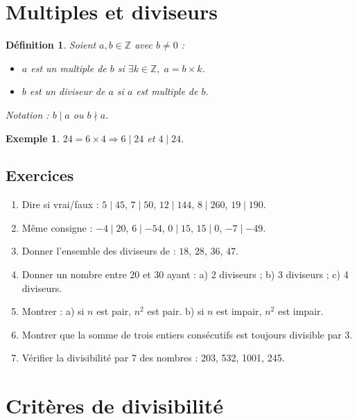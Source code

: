 \documentclass[12pt,a4paper]{article}
\newtheorem{definition}{Définition}[section]
\newtheorem{example}{Exemple}[section]
\begin{document}
\section{Multiples et diviseurs}

\begin{definition}
Soient $a,b \in \mathbb{Z}$ avec $b \neq 0$ :  
\begin{itemize}
    \item $a$ est un multiple de $b$ si $\exists k \in \mathbb{Z},\; a = b \times k$.  
    \item $b$ est un diviseur de $a$ si $a$ est multiple de $b$.  
\end{itemize}
Notation : $b \mid a$ ou $b \nmid a$.
\end{definition}

\begin{example}
$24 = 6 \times 4 \Rightarrow 6 \mid 24$ et $4 \mid 24$.
\end{example}

\subsection*{Exercices}
\begin{enumerate}
    \item Dire si vrai/faux : $5 \mid 45$, $7 \mid 50$, $12 \mid 144$, $8 \mid 260$, $19 \mid 190$.
    \item Même consigne : $-4 \mid 20$, $6 \mid -54$, $0 \mid 15$, $15 \mid 0$, $-7 \mid -49$.
    \item Donner l’ensemble des diviseurs de : $18$, $28$, $36$, $47$.
    \item Donner un nombre entre 20 et 30 ayant :  
    a) 2 diviseurs ; b) 3 diviseurs ; c) 4 diviseurs.
    \item Montrer :  
    a) si $n$ est pair, $n^2$ est pair.  
    b) si $n$ est impair, $n^2$ est impair.
    \item Montrer que la somme de trois entiers consécutifs est toujours divisible par 3.
    \item Vérifier la divisibilité par 7 des nombres : 203, 532, 1001, 245.
\end{enumerate}

\section{Critères de divisibilité}
\end{document}
